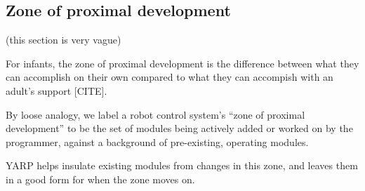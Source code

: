 
\subsection*{Zone of proximal development}

(this section is very vague)

For infants, the zone of proximal development is the
difference between what they can accomplish on their
own compared to what they can accompish with an
adult's support [CITE].

By loose analogy, we label a robot control system's ``zone of proximal
development'' to be the set of modules being actively added or worked
on by the programmer, against a background of pre-existing, operating
modules.  

YARP helps insulate existing modules from changes in this zone,
and leaves them in a good form for when the zone moves on.

